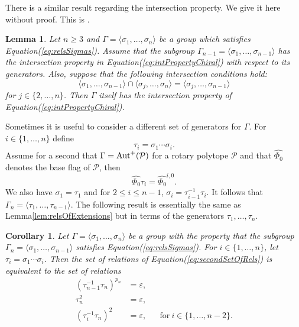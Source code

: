\documentclass[final]{amsart}
\theoremstyle{plain}
\newtheorem{lem}[thm]{Lemma}
\newtheorem{coro}[thm]{Corollary}
\theoremstyle{definition}
\theoremstyle{remark}
\numberwithin{equation}{section}
\renewcommand{\leq}{\leqslant} \renewcommand{\geq}{\geqslant}
\renewcommand{\{}{\lbrace}
\renewcommand{\}}{\rbrace}
\renewcommand{\hat}{\widehat}
\newcommand{\cP}{\mathcal{P}}
\newcommand{\id}{\varepsilon}
\begin{document}
There is a similar result regarding the intersection property. 
We give it here without proof. 
This is \cite[Lemma 10]{SchulteWeiss_1991_ChiralPolytopes}.

\begin{lem}\label{lem:Lemma10}
  Let $n \geq 3$ and $\Gamma = \langle \sigma_{1}, \dots, \sigma_{n} \rangle$ be a group which satisfies Equation\nobreakspace \textup {(\ref {eq:relsSigmas})}. Assume that the subgroup $\Gamma_{n-1} = \langle \sigma_{1}, \dots, \sigma_{n-1} \rangle$ has the intersection property in Equation\nobreakspace \textup {(\ref {eq:intPropertyChiral})} with respect to its generators. Also, suppose that the following intersection conditions hold:
  \begin{equation}\label{eq:Lemma10}
    \langle \sigma_{1}, \dots, \sigma_{n-1} \rangle \cap \langle \sigma_{j}, \dots, \sigma_{n} \rangle = \langle \sigma_{j}, \dots, \sigma_{n-1} \rangle
  \end{equation}
	for $j \in \{2, \dots, n\}$. Then $\Gamma$ itself has the intersection property of Equation\nobreakspace \textup {(\ref {eq:intPropertyChiral})}.
\end{lem}


Sometimes it is useful to consider a different set of generators for $\Gamma$. 
For $i \in \{1, \dots, n\}$ define
\begin{equation}\label{eq:goodTaus}
  \tau_{i}=\sigma_{1}\cdots \sigma_{i}.
\end{equation}
Assume for a second that $\Gamma = \autp(\cP)$ for a rotary polytope $\cP$ and that $\hat{\Phi_{0}}$ denotes the base flag of $\cP$, then \[\hat{\Phi_{0}} \tau_{i} = \hat{\Phi_{0}}^{i,0}.\] 
We also have $\sigma_{1} = \tau_{1}$ and for $2 \leq i \leq n-1$, $\sigma_{i} = \tau^{-1}_{i-1} \tau_{i}$. 
It follows that 
$\Gamma_{n}=\langle \tau_{1}, \dots, \tau_{n-1} \rangle$.
The following result is essentially the same as Lemma\nobreakspace \ref {lem:relsOfExtensions} but in terms of the generators $\tau_{1}, \dots, \tau_{n}$.

\begin{coro}\label{coro:relsOfExtensionsTaus}
  Let $\Gamma = \langle \sigma_{1}, \dots, \sigma_{n} \rangle$ be a group with the property that the subgroup $\Gamma_{n} = \langle \sigma_{1}, \dots, \sigma_{n-1} \rangle$ satisfies Equation\nobreakspace \textup {(\ref {eq:relsSigmas})}. For $i \in \{1, \dots, n\}$, let $\tau_{i} = \sigma_{1} \cdots \sigma_{i}$. Then the set of relations of Equation\nobreakspace \textup {(\ref {eq:secondSetOfRels})} is equivalent to the set of relations
  \begin{equation}\label{eq:relsOfExtensionsTaus}
    \begin{aligned}
      (\tau_{n-1}^{-1}\tau_{n})^{p_{n}} &= \id,\\
      \tau^{2}_{n} &= \id,\\
      (\tau^{-1}_{i} \tau_{n})^{2} &= \id, && \text{for}\ i \in \{1, \dots, n-2\}.
    \end{aligned}
  \end{equation}
\end{coro}
\end{document}
